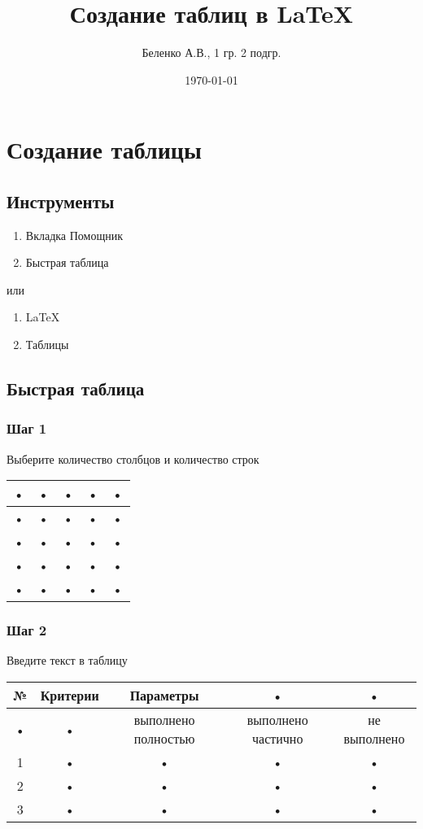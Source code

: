 \documentclass[a4paper,12pt]{article} %
\author{Беленко А.В., 1 гр. 2 подгр.}
\title{Создание таблиц в \LaTeX}
\date{\today}
\begin{document}
\maketitle
\newpage
\section{Создание таблицы}
\subsection{Инструменты}
\begin{enumerate}
\item Вкладка Помощник
\item Быстрая таблица
\end{enumerate}

или

\begin{enumerate}
\item LaTeX
\item Таблицы
\end{enumerate}

\subsection{Быстрая таблица}
\subsubsection{Шаг 1}
Выберите количество столбцов и количество строк\\
\begin{tabular}{|c|c|c|c|c|}
\hline
• & • & • & • & • \\
\hline
• & • & • & • & • \\
\hline
• & • & • & • & • \\
\hline
• & • & • & • & • \\
\hline
• & • & • & • & • \\
\hline
\end{tabular}

\subsubsection{Шаг 2}
Введите текст в таблицу\\
\begin{tabular}{|c|c|c|c|c|}
\hline
№ & Критерии & Параметры & • & • \\
\hline
• & • & выполнено полностью & выполнено частично & не выполнено \\
\hline
1 & • & • & • & • \\
\hline
2 & • & • & • & • \\
\hline
3 & • & • & • & • \\
\hline
\end{tabular}
\end{document}
